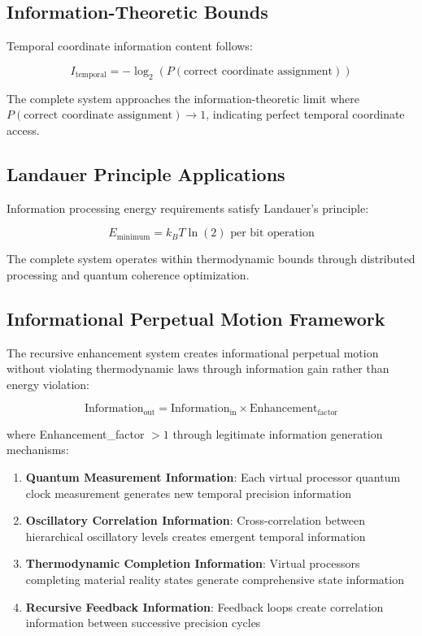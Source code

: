 \documentclass[11pt]{article}
\theoremstyle{remark}
\begin{document}
\subsection{Information-Theoretic Bounds}

Temporal coordinate information content follows:

$$I_{\text{temporal}} = -\log_2(P(\text{correct coordinate assignment}))$$

The complete system approaches the information-theoretic limit where $P(\text{correct coordinate assignment}) \to 1$, indicating perfect temporal coordinate access.

\subsection{Landauer Principle Applications}

Information processing energy requirements satisfy Landauer's principle:

$$E_{\text{minimum}} = k_B T \ln(2) \text{ per bit operation}$$

The complete system operates within thermodynamic bounds through distributed processing and quantum coherence optimization.

\subsection{Informational Perpetual Motion Framework}

The recursive enhancement system creates informational perpetual motion without violating thermodynamic laws through information gain rather than energy violation:

$$\text{Information}_{\text{out}} = \text{Information}_{\text{in}} \times \text{Enhancement}_{\text{factor}}$$

where Enhancement\_factor $> 1$ through legitimate information generation mechanisms:

\begin{enumerate}
\item \textbf{Quantum Measurement Information}: Each virtual processor quantum clock measurement generates new temporal precision information
\item \textbf{Oscillatory Correlation Information}: Cross-correlation between hierarchical oscillatory levels creates emergent temporal information
\item \textbf{Thermodynamic Completion Information}: Virtual processors completing material reality states generate comprehensive state information
\item \textbf{Recursive Feedback Information}: Feedback loops create correlation information between successive precision cycles
\end{enumerate}
\end{document}

